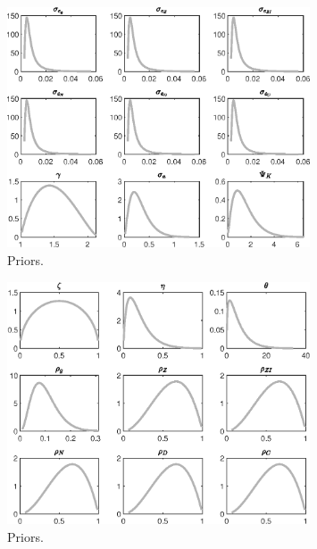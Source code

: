  
\begin{figure}[H]
\centering
\includegraphics[width=0.80\textwidth]{BRS_imp_mobility_est/graphs/BRS_imp_mobility_est_Priors1}
\caption{Priors.}\label{Fig:Priors:1}
\end{figure}
\begin{figure}[H]
\centering
\includegraphics[width=0.80\textwidth]{BRS_imp_mobility_est/graphs/BRS_imp_mobility_est_Priors2}
\caption{Priors.}\label{Fig:Priors:2}
\end{figure}
 

